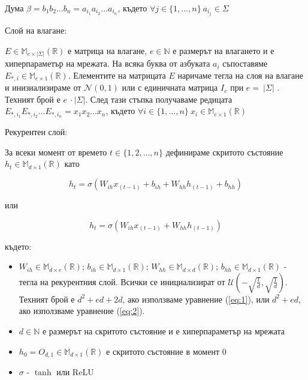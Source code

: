 \documentclass[a4paper,12pt]{article}
\begin{document}
Дума $\beta = b_1 b_2 \ldots b_n = a_{i_1} a_{i_2} \ldots a_{i_n}$, където $\forall j \in \{1, \ldots, n\} \: a_{i_j} \in \Sigma$

Слой на влагане:

$E \in \mathbb{M}_{e \times |\Sigma|} (\mathbb{R})$ е матрица на влагане, $e \in \mathbb{N}$ е размерът на влагането и е хиперпараметър на мрежата. 
На всяка буква от азбуката $a_i$ съпоставяме $E_{*, i} \in \mathbb{M}_{e \times 1} (\mathbb{R})$. Елементите на матрицата $E$ наричаме тегла на слоя на влагане и инизиализираме от $\mathcal{N}(0, 1)$ или с единичната матрица $I_e$ при $e =\:|\Sigma|$ . Техният брой е $e\:\cdot |\Sigma|$. След тази стъпка получаваме редицата $E_{*, i_1}E_{*, i_2} \ldots E_{*, i_n} = x_1 x_2 \ldots x_n$, където $\forall i \in \{1, \ldots, n\} \: x_i \in \mathbb{M}_{e \times 1} (\mathbb{R})$

Рекурентен слой:

За всеки момент от времето $t \in \{1, 2, \ldots, n\}$ дефинираме скритото състояние $h_t \in \mathbb{M}_{d \times 1} (\mathbb{R})$ като

\begin{equation} \label{eq:1}
h_t = \sigma(W_{ih} x_{(t-1)} + b_{ih} + W_{hh} h_{(t-1)} + b_{hh})
\end{equation}

или 

\begin{equation} \label{eq:2}
h_t = \sigma(W_{ih} x_{(t-1)} + W_{hh} h_{(t-1)})
\end{equation}

където:

\begin{itemize}
\item $W_{ih} \in \mathbb{M}_{d \times e} (\mathbb{R})$; $b_{ih} \in \mathbb{M}_{d \times 1} (\mathbb{R})$; $W_{hh} \in \mathbb{M}_{d \times d} (\mathbb{R})$; $b_{hh} \in \mathbb{M}_{d \times 1} (\mathbb{R})$ - тегла на рекурентния слой. Всички се инициализират от $\mathcal{U}(-\sqrt{\frac{1}{d}}, \sqrt{\frac{1}{d}})$. Техният брой е $d^2 + ed + 2d$, ако използваме уравнение (\ref{eq:1}), или $d^2 + ed$, ако използваме уравнение (\ref{eq:2}).
\item $d \in \mathbb{N}$ е размерът на скритото състояние и е хиперпараметър на мрежата
\item $h_0 = O_{d, 1} \in \mathbb{M}_{d \times 1} (\mathbb{R})$ е скритото състояние в момент 0
\item $\sigma$ - $\tanh$ или ReLU
\end{itemize}
\end{document}
